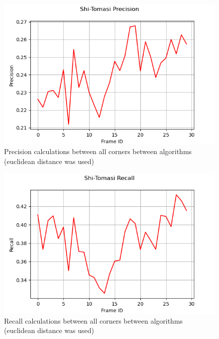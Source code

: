 \documentclass[11pt, conference, letterpaper]{IEEEtran}
\begin{document}
\begin{figure}[t]
    \centering
    \includegraphics[width=\linewidth]{images/stc_precision.png}
    \caption{Precision calculations between all corners between algorithms (euclidean distance was used)}
    \label{fig:stc-prec}
\end{figure}

\begin{figure}[t]
    \centering
    \includegraphics[width=\linewidth]{images/stc_recall.png}
    \caption{Recall calculations between all corners between algorithms (euclidean distance was used)}
    \label{fig:stc-rec}
\end{figure}
\end{document}
